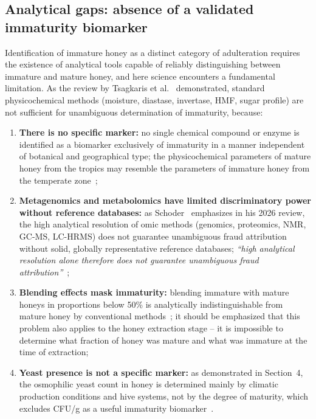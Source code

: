 \subsection{Analytical gaps: absence of a validated immaturity biomarker}

Identification of immature honey as a distinct category of
adulteration requires the existence of analytical tools capable of
reliably distinguishing between immature and mature honey, and here
science encounters a fundamental limitation. As the review by
Tsagkaris et al.~\cite{tsagkaris2021} demonstrated, standard
physicochemical methods (moisture, diastase, invertase, HMF,
sugar profile) are not sufficient for unambiguous determination
of immaturity, because:

\begin{enumerate}
    \item \textbf{There is no specific marker:}
          no single chemical compound or enzyme is identified
          as a biomarker exclusively of immaturity in a manner
          independent of botanical and geographical type;
          the physicochemical parameters of mature honey from
          the tropics may resemble the parameters of immature
          honey from the temperate zone~\cite{tsagkaris2021,guo2020};
    \item \textbf{Metagenomics and metabolomics have limited
          discriminatory power without reference databases:}
          as Schoder~\cite{schoder2026} emphasizes in his 2026
          review, the high analytical resolution of omic methods
          (genomics, proteomics, NMR, GC-MS, LC-HRMS) does not
          guarantee unambiguous fraud attribution without solid,
          globally representative reference databases;
          \textit{``high analytical resolution alone therefore
          does not guarantee unambiguous fraud
          attribution''}~\cite{schoder2026};
    \item \textbf{Blending effects mask immaturity:}
          blending immature with mature honeys in proportions
          below 50\% is analytically indistinguishable from mature
          honey by conventional methods~\cite{schoder2026}; it
          should be emphasized that this problem also applies to
          the honey extraction stage -- it is impossible to
          determine what fraction of honey was mature and what
          was immature at the time of extraction;
    \item \textbf{Yeast presence is not a specific marker:}
          as demonstrated in Section~4, the osmophilic yeast count
          in honey is determined mainly by climatic production
          conditions and hive systems, not by the degree of
          maturity, which excludes CFU/g as a useful immaturity
          biomarker~\cite{rodriguezmachado2024,schoder2026}.
\end{enumerate}

